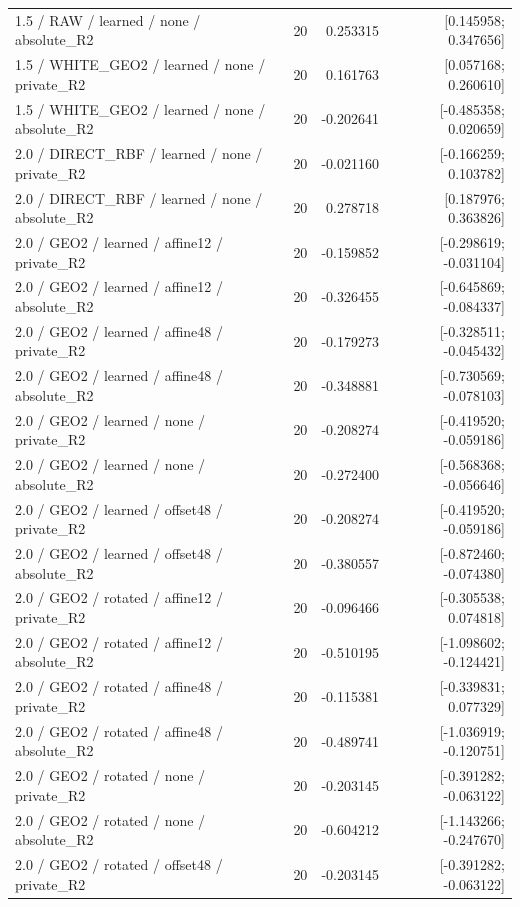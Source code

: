 \begin{longtable}{p{.56\linewidth}rrr}
1.5 / RAW / learned / none / absolute\_R2 & 20 & 0.253315 & [0.145958; 0.347656] \\
1.5 / WHITE\_GEO2 / learned / none / private\_R2 & 20 & 0.161763 & [0.057168; 0.260610] \\
1.5 / WHITE\_GEO2 / learned / none / absolute\_R2 & 20 & -0.202641 & [-0.485358; 0.020659] \\
2.0 / DIRECT\_RBF / learned / none / private\_R2 & 20 & -0.021160 & [-0.166259; 0.103782] \\
2.0 / DIRECT\_RBF / learned / none / absolute\_R2 & 20 & 0.278718 & [0.187976; 0.363826] \\
2.0 / GEO2 / learned / affine12 / private\_R2 & 20 & -0.159852 & [-0.298619; -0.031104] \\
2.0 / GEO2 / learned / affine12 / absolute\_R2 & 20 & -0.326455 & [-0.645869; -0.084337] \\
2.0 / GEO2 / learned / affine48 / private\_R2 & 20 & -0.179273 & [-0.328511; -0.045432] \\
2.0 / GEO2 / learned / affine48 / absolute\_R2 & 20 & -0.348881 & [-0.730569; -0.078103] \\
2.0 / GEO2 / learned / none / private\_R2 & 20 & -0.208274 & [-0.419520; -0.059186] \\
2.0 / GEO2 / learned / none / absolute\_R2 & 20 & -0.272400 & [-0.568368; -0.056646] \\
2.0 / GEO2 / learned / offset48 / private\_R2 & 20 & -0.208274 & [-0.419520; -0.059186] \\
2.0 / GEO2 / learned / offset48 / absolute\_R2 & 20 & -0.380557 & [-0.872460; -0.074380] \\
2.0 / GEO2 / rotated / affine12 / private\_R2 & 20 & -0.096466 & [-0.305538; 0.074818] \\
2.0 / GEO2 / rotated / affine12 / absolute\_R2 & 20 & -0.510195 & [-1.098602; -0.124421] \\
2.0 / GEO2 / rotated / affine48 / private\_R2 & 20 & -0.115381 & [-0.339831; 0.077329] \\
2.0 / GEO2 / rotated / affine48 / absolute\_R2 & 20 & -0.489741 & [-1.036919; -0.120751] \\
2.0 / GEO2 / rotated / none / private\_R2 & 20 & -0.203145 & [-0.391282; -0.063122] \\
2.0 / GEO2 / rotated / none / absolute\_R2 & 20 & -0.604212 & [-1.143266; -0.247670] \\
2.0 / GEO2 / rotated / offset48 / private\_R2 & 20 & -0.203145 & [-0.391282; -0.063122] \\

\end{longtable}
